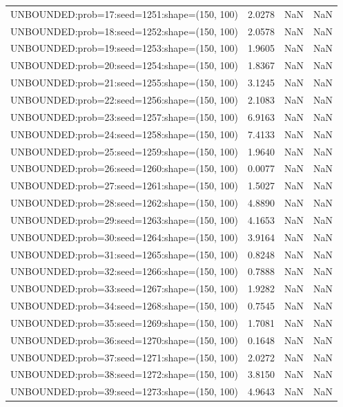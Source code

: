\begin{longtable}{lccc}
UNBOUNDED:prob=17:seed=1251:shape=(150, 100)  &  2.0278 &   NaN &    NaN \\
UNBOUNDED:prob=18:seed=1252:shape=(150, 100)  &  2.0578 &   NaN &    NaN \\
UNBOUNDED:prob=19:seed=1253:shape=(150, 100)  &  1.9605 &   NaN &    NaN \\
UNBOUNDED:prob=20:seed=1254:shape=(150, 100)  &  1.8367 &   NaN &    NaN \\
UNBOUNDED:prob=21:seed=1255:shape=(150, 100)  &  3.1245 &   NaN &    NaN \\
UNBOUNDED:prob=22:seed=1256:shape=(150, 100)  &  2.1083 &   NaN &    NaN \\
UNBOUNDED:prob=23:seed=1257:shape=(150, 100)  &  6.9163 &   NaN &    NaN \\
UNBOUNDED:prob=24:seed=1258:shape=(150, 100)  &  7.4133 &   NaN &    NaN \\
UNBOUNDED:prob=25:seed=1259:shape=(150, 100)  &  1.9640 &   NaN &    NaN \\
UNBOUNDED:prob=26:seed=1260:shape=(150, 100)  &  0.0077 &   NaN &    NaN \\
UNBOUNDED:prob=27:seed=1261:shape=(150, 100)  &  1.5027 &   NaN &    NaN \\
UNBOUNDED:prob=28:seed=1262:shape=(150, 100)  &  4.8890 &   NaN &    NaN \\
UNBOUNDED:prob=29:seed=1263:shape=(150, 100)  &  4.1653 &   NaN &    NaN \\
UNBOUNDED:prob=30:seed=1264:shape=(150, 100)  &  3.9164 &   NaN &    NaN \\
UNBOUNDED:prob=31:seed=1265:shape=(150, 100)  &  0.8248 &   NaN &    NaN \\
UNBOUNDED:prob=32:seed=1266:shape=(150, 100)  &  0.7888 &   NaN &    NaN \\
UNBOUNDED:prob=33:seed=1267:shape=(150, 100)  &  1.9282 &   NaN &    NaN \\
UNBOUNDED:prob=34:seed=1268:shape=(150, 100)  &  0.7545 &   NaN &    NaN \\
UNBOUNDED:prob=35:seed=1269:shape=(150, 100)  &  1.7081 &   NaN &    NaN \\
UNBOUNDED:prob=36:seed=1270:shape=(150, 100)  &  0.1648 &   NaN &    NaN \\
UNBOUNDED:prob=37:seed=1271:shape=(150, 100)  &  2.0272 &   NaN &    NaN \\
UNBOUNDED:prob=38:seed=1272:shape=(150, 100)  &  3.8150 &   NaN &    NaN \\
UNBOUNDED:prob=39:seed=1273:shape=(150, 100)  &  4.9643 &   NaN &    NaN \\

\end{longtable}
